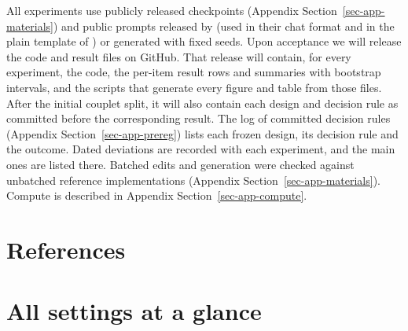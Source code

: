 \documentclass[
]{article}
\begin{document}
All experiments use publicly released checkpoints (Appendix
Section~\ref{sec-app-materials}) and public prompts released by
\citeauthor{hanna2026latent}
\citetext{\citeyear{hanna2026latent}; \citealp{hanna2026planningdata}}
(used in their chat format and in the plain template of
\citet{ma2026plan}) or generated with fixed seeds. Upon acceptance we
will release the code and result files on GitHub. That release will
contain, for every experiment, the code, the per-item result rows and
summaries with bootstrap intervals, and the scripts that generate every
figure and table from those files. After the initial couplet split, it
will also contain each design and decision rule as committed before the
corresponding result. The log of committed decision rules (Appendix
Section~\ref{sec-app-prereg}) lists each frozen design, its decision
rule and the outcome. Dated deviations are recorded with each
experiment, and the main ones are listed there. Batched edits and
generation were checked against unbatched reference implementations
(Appendix Section~\ref{sec-app-materials}). Compute is described in
Appendix Section~\ref{sec-app-compute}.

\section*{References}\label{references}

\renewcommand{\bibsection}{}


\appendix

\setcounter{figure}{0}
\renewcommand{\thefigure}{A\arabic{figure}}
\setcounter{table}{0}
\renewcommand{\thetable}{A\arabic{table}}

\section{All settings at a glance}\label{sec-app-overview}
\end{document}
